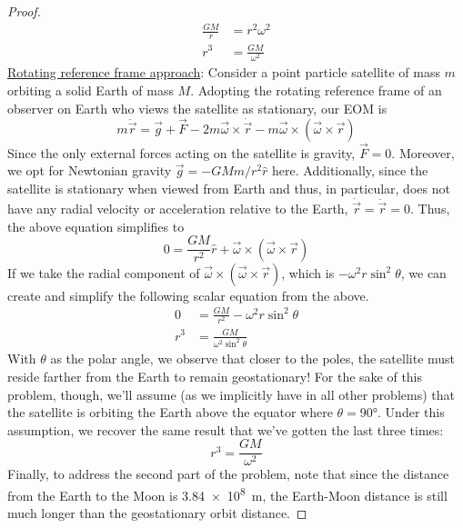 \documentclass[../psets.tex]{subfiles}
\begin{document}
\begin{enumerate}
\begin{proof}
\begin{align*}
            \frac{GM}{r} &= r^2\omega^2\\
            r^3 &= \frac{GM}{\omega^2}
        \end{align*}
        \underline{Rotating reference frame approach}: Consider a point particle satellite of mass $m$ orbiting a solid Earth of mass $M$. Adopting the rotating reference frame of an observer on Earth who views the satellite as stationary, our EOM is
        \begin{equation*}
            m\ddot{\vec{r}} = \vec{g}+\vec{F}-2m\vec{\omega}\times\dot{\vec{r}}-m\vec{\omega}\times(\vec{\omega}\times\vec{r})
        \end{equation*}
        Since the only external forces acting on the satellite is gravity, $\vec{F}=0$. Moreover, we opt for Newtonian gravity $\vec{g}=-GMm/r^2\hat{r}$ here. Additionally, since the satellite is stationary when viewed from Earth and thus, in particular, does not have any radial velocity or acceleration relative to the Earth, $\dot{\vec{r}}=\ddot{\vec{r}}=0$. Thus, the above equation simplifies to
        \begin{equation*}
            0 = \frac{GM}{r^2}\hat{r}+\vec{\omega}\times(\vec{\omega}\times\vec{r})
        \end{equation*}
        If we take the radial component of $\vec{\omega}\times(\vec{\omega}\times\vec{r})$, which is $-\omega^2r\sin^2\theta$, we can create and simplify the following scalar equation from the above.
        \begin{align*}
            0 &= \frac{GM}{r^2}-\omega^2r\sin^2\theta\\
            r^3 &= \frac{GM}{\omega^2\sin^2\theta}
        \end{align*}
        With $\theta$ as the polar angle, we observe that closer to the poles, the satellite must reside farther from the Earth to remain geostationary! For the sake of this problem, though, we'll assume (as we implicitly have in all other problems) that the satellite is orbiting the Earth above the equator where $\theta=\ang{90}$. Under this assumption, we recover the same result that we've gotten the last three times:
        \begin{equation*}
            r^3 = \frac{GM}{\omega^2}
        \end{equation*}
        Finally, to address the second part of the problem, note that since the distance from the Earth to the Moon is \SI{3.84e8}{\meter}, the Earth-Moon distance is still much longer than the geostationary orbit distance.
    \end{proof}

\end{enumerate}
\end{document}

